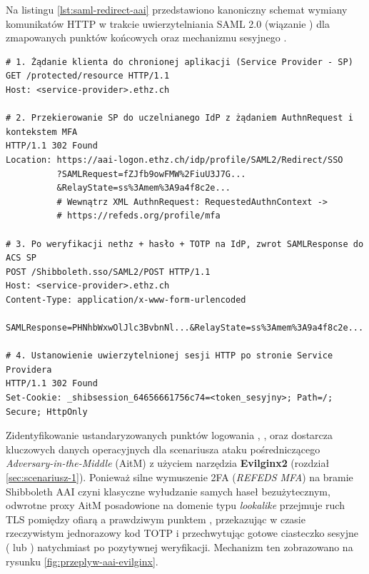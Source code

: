 {{Na listingu \ref{lst:saml-redirect-aai} przedstawiono kanoniczny schemat wymiany komunikatów HTTP w trakcie uwierzytelniania SAML 2.0 (wiązanie ) dla zmapowanych punktów końcowych  oraz mechanizmu sesyjnego .

\begin{lstlisting}[caption={Schemat wiązania SAML 2.0 HTTP-Redirect oraz ustanawiania sesji dla punktu końcowego aai-logon.ethz.ch}, label={lst:saml-redirect-aai}]
# 1. Żądanie klienta do chronionej aplikacji (Service Provider - SP)
GET /protected/resource HTTP/1.1
Host: <service-provider>.ethz.ch

# 2. Przekierowanie SP do uczelnianego IdP z żądaniem AuthnRequest i kontekstem MFA
HTTP/1.1 302 Found
Location: https://aai-logon.ethz.ch/idp/profile/SAML2/Redirect/SSO
          ?SAMLRequest=fZJfb9owFMW%2FiuU3J7G...
          &RelayState=ss%3Amem%3A9a4f8c2e...
          # Wewnątrz XML AuthnRequest: RequestedAuthnContext ->
          # https://refeds.org/profile/mfa

# 3. Po weryfikacji nethz + hasło + TOTP na IdP, zwrot SAMLResponse do ACS SP
POST /Shibboleth.sso/SAML2/POST HTTP/1.1
Host: <service-provider>.ethz.ch
Content-Type: application/x-www-form-urlencoded

SAMLResponse=PHNhbWxwOlJlc3BvbnNl...&RelayState=ss%3Amem%3A9a4f8c2e...

# 4. Ustanowienie uwierzytelnionej sesji HTTP po stronie Service Providera
HTTP/1.1 302 Found
Set-Cookie: _shibsession_64656661756c74=<token_sesyjny>; Path=/; Secure; HttpOnly
\end{lstlisting}

Zidentyfikowanie ustandaryzowanych punktów logowania , ,  oraz  dostarcza kluczowych danych operacyjnych dla scenariusza ataku pośredniczącego \textit{Adversary-in-the-Middle} (AitM) z użyciem narzędzia \textbf{Evilginx2} (rozdział \ref{sec:scenariusz-1}). Ponieważ silne wymuszenie 2FA (\textit{REFEDS MFA}) na bramie Shibboleth AAI czyni klasyczne wyłudzanie samych haseł bezużytecznym, odwrotne proxy AitM posadowione na domenie typu \textit{lookalike} przejmuje ruch TLS pomiędzy ofiarą a prawdziwym punktem , przekazując w czasie rzeczywistym jednorazowy kod TOTP i przechwytując gotowe ciasteczko sesyjne ( lub ) natychmiast po pozytywnej weryfikacji. Mechanizm ten zobrazowano na rysunku \ref{fig:przeplyw-aai-evilginx}.

}}
